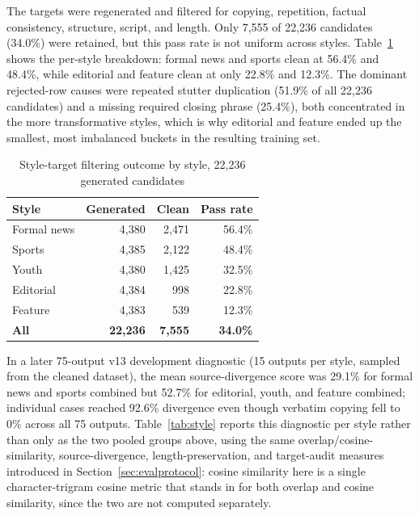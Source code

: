 \documentclass[a4paper,conference]{IEEEtran}
\begin{document}
The targets were regenerated and filtered for copying, repetition, factual
consistency, structure, script, and length. Only 7,555 of 22,236 candidates
(34.0\%) were retained, but this pass rate is not uniform across styles.
Table~\ref{tab:stylefilter} shows the per-style breakdown: formal news and
sports clean at 56.4\% and 48.4\%, while editorial and feature clean at only
22.8\% and 12.3\%. The dominant rejected-row causes were repeated stutter
duplication (51.9\% of all 22,236 candidates) and a missing required closing
phrase (25.4\%), both concentrated in the more transformative styles, which is
why editorial and feature ended up the smallest, most imbalanced buckets in
the resulting training set.

\begin{table}[!b]
\caption{Style-target filtering outcome by style, 22,236 generated candidates}
\label{tab:stylefilter}
\centering
\footnotesize
\setlength{\tabcolsep}{3pt}
\renewcommand{\arraystretch}{1.04}
\begin{tabular}{|l|r|r|r|}
\hline
\textbf{Style} & \textbf{Generated} & \textbf{Clean} & \textbf{Pass rate} \\
\hline
Formal news & 4,380 & 2,471 & 56.4\% \\
\hline
Sports      & 4,385 & 2,122 & 48.4\% \\
\hline
Youth       & 4,380 & 1,425 & 32.5\% \\
\hline
Editorial   & 4,384 & 998   & 22.8\% \\
\hline
Feature     & 4,383 & 539   & 12.3\% \\
\hline
\textbf{All} & \textbf{22,236} & \textbf{7,555} & \textbf{34.0\%} \\
\hline
\end{tabular}
\end{table}

In a later 75-output v13 development diagnostic (15 outputs per style, sampled
from the cleaned dataset), the mean source-divergence score was 29.1\% for
formal news and sports combined but 52.7\% for editorial, youth, and feature
combined; individual cases reached 92.6\% divergence even though verbatim
copying fell to 0\% across all 75 outputs. Table~\ref{tab:style} reports this
diagnostic per style rather than only as the two pooled groups above, using
the same overlap/cosine-similarity, source-divergence, length-preservation,
and target-audit measures introduced in Section~\ref{sec:evalprotocol}: cosine
similarity here is a single character-trigram cosine metric that stands in for
both overlap and cosine similarity, since the two are not computed separately.
\end{document}
